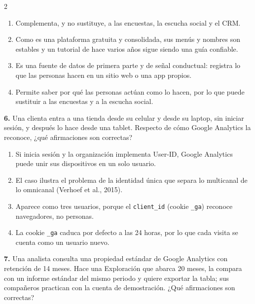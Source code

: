 \documentclass[10pt,letterpaper]{article}
\newcommand{\cas}{\framebox[1.0em]{\rule{0pt}{1.05ex}}}
\begin{document}
\begin{multicols}{2}
\begin{minipage}[t]{\columnwidth}
\begin{enumerate}[label=\cas\ \alph*),leftmargin=2.3em,itemsep=1.2pt,topsep=1pt,parsep=0pt,partopsep=0pt]
\item Complementa, y no sustituye, a las encuestas, la escucha social y el CRM.
\item Como es una plataforma gratuita y consolidada, sus menús y nombres son estables y un tutorial de hace varios años sigue siendo una guía confiable.
\item Es una fuente de datos de primera parte y de señal conductual: registra lo que las personas hacen en un sitio web o una app propios.
\item Permite saber por qué las personas actúan como lo hacen, por lo que puede sustituir a las encuestas y a la escucha social.
\end{enumerate}\end{minipage}\par\vspace{3pt}
\begin{minipage}[t]{\columnwidth}\noindent\textbf{6.} Una clienta entra a una tienda desde su celular y desde su laptop, sin iniciar sesión, y después lo hace desde una tablet. Respecto de cómo Google Analytics la reconoce, ¿qué afirmaciones son correctas?
\vspace{1pt}\begin{enumerate}[label=\cas\ \alph*),leftmargin=2.3em,itemsep=1.2pt,topsep=1pt,parsep=0pt,partopsep=0pt]
\item Si inicia sesión y la organización implementa User-ID, Google Analytics puede unir sus dispositivos en un solo usuario.
\item El caso ilustra el problema de la identidad única que separa lo multicanal de lo omnicanal (Verhoef et al., 2015).
\item Aparece como tres usuarios, porque el \texttt{client\_id} (cookie \texttt{\_ga}) reconoce navegadores, no personas.
\item La cookie \texttt{\_ga} caduca por defecto a las 24 horas, por lo que cada visita se cuenta como un usuario nuevo.
\end{enumerate}\end{minipage}\par\vspace{3pt}
\begin{minipage}[t]{\columnwidth}\noindent\textbf{7.} Una analista consulta una propiedad estándar de Google Analytics con retención de 14 meses. Hace una Exploración que abarca 20 meses, la compara con un informe estándar del mismo periodo y quiere exportar la tabla; sus compañeros practican con la cuenta de demostración. ¿Qué afirmaciones son correctas?

\end{minipage}
\end{multicols}
\end{document}
